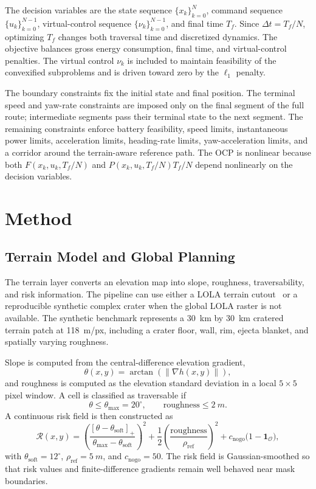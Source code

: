 The decision variables are the state sequence $\{x_k\}_{k=0}^{N}$, command sequence $\{u_k\}_{k=0}^{N-1}$, virtual-control sequence $\{\nu_k\}_{k=0}^{N-1}$, and final time $T_f$. Since $\Delta t=T_f/N$, optimizing $T_f$ changes both traversal time and discretized dynamics. The objective balances gross energy consumption, final time, and virtual-control penalties. The virtual control $\nu_k$ is included to maintain feasibility of the convexified subproblems and is driven toward zero by the $\ell_1$ penalty.

The boundary constraints fix the initial state and final position. The terminal speed and yaw-rate constraints are imposed only on the final segment of the full route; intermediate segments pass their terminal state to the next segment. The remaining constraints enforce battery feasibility, speed limits, instantaneous power limits, acceleration limits, heading-rate limits, yaw-acceleration limits, and a corridor around the terrain-aware reference path. The OCP is nonlinear because both $F(x_k,u_k,T_f/N)$ and $P(x_k,u_k,T_f/N)T_f/N$ depend nonlinearly on the decision variables.

\section{Method}
\subsection{Terrain Model and Global Planning}
The terrain layer converts an elevation map into slope, roughness, traversability, and risk information. The pipeline can use either a LOLA terrain cutout~\cite{nasa_lola,moon_sokolov} or a reproducible synthetic complex crater when the global LOLA raster is not available. The synthetic benchmark represents a \SI{30}{km} by \SI{30}{km} cratered terrain patch at \SI{118}{m/px}, including a crater floor, wall, rim, ejecta blanket, and spatially varying roughness.

Slope is computed from the central-difference elevation gradient,
\begin{equation}
    \theta(x,y)=\arctan\!\left(\|\nabla h(x,y)\|\right),
\end{equation}
and roughness is computed as the elevation standard deviation in a local $5\times5$ pixel window. A cell is classified as traversable if
\begin{equation}
    \theta \leq \theta_{\max}=20^\circ,
    \qquad
    \mathrm{roughness}\leq \SI{2}{m}.
\end{equation}
A continuous risk field is then constructed as
\begin{equation}
\mathcal{R}(x,y) =
  \left(\frac{[\theta - \theta_{\mathrm{soft}}]_+}{\theta_{\max} - \theta_{\mathrm{soft}}}\right)^2
  + \frac{1}{2}\left(\frac{\mathrm{roughness}}{\rho_{\mathrm{ref}}}\right)^2
  + c_{\mathrm{nogo}}\bigl(1 - \mathbf{1}_{\mathcal{O}}\bigr),
\end{equation}
with $\theta_{\mathrm{soft}}=12^\circ$, $\rho_{\mathrm{ref}}=\SI{5}{m}$, and $c_{\mathrm{nogo}}=50$. The risk field is Gaussian-smoothed so that risk values and finite-difference gradients remain well behaved near mask boundaries.


